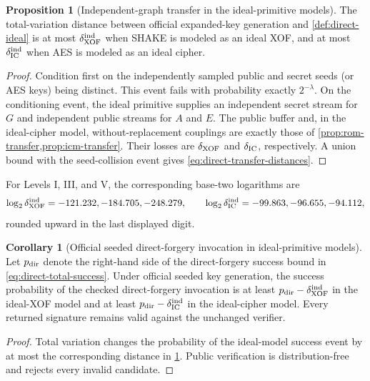 \documentclass[11pt,a4paper]{article}
\theoremstyle{definition}
\newtheorem{proposition}[theorem]{Proposition}
\newtheorem{corollary}[theorem]{Corollary}
\theoremstyle{remark}
\begin{document}
\begin{proposition}[Independent-graph transfer in the ideal-primitive models]\label{prop:direct-seeded-transfer}
The total-variation distance between official expanded-key generation and
\cref{def:direct-ideal} is at most $\delta_{\rm XOF}^{\rm ind}$ when SHAKE is
modeled as an ideal XOF, and at most $\delta_{\rm IC}^{\rm ind}$ when AES is
modeled as an ideal cipher.
\end{proposition}

\begin{proof}
Condition first on the independently sampled public and secret seeds (or AES
keys) being distinct.  This event fails with probability exactly $2^{-\lambda}$.
On the conditioning event, the ideal primitive supplies an independent secret
stream for $G$ and independent public streams for $A$ and $E$.  The public
buffer and, in the ideal-cipher model, without-replacement couplings are
exactly those of \cref{prop:rom-transfer,prop:icm-transfer}.  Their losses are
$\delta_{\rm XOF}$ and $\delta_{\rm IC}$, respectively.  A union bound with the
seed-collision event gives \eqref{eq:direct-transfer-distances}.
\end{proof}

For Levels I, III, and V, the corresponding base-two logarithms are
\[
 \log_2\delta_{\rm XOF}^{\rm ind}
   =-121.232,-184.705,-248.279,
 \qquad
 \log_2\delta_{\rm IC}^{\rm ind}
   =-99.863,-96.655,-94.112,
\]
rounded upward in the last displayed digit.

\begin{corollary}[Official seeded direct-forgery invocation in ideal-primitive models]\label{cor:direct-seeded-ideal}
Let $p_{\rm dir}$ denote the right-hand side of the direct-forgery success bound
in \eqref{eq:direct-total-success}.  Under official seeded key generation, the
success probability of the checked direct-forgery invocation is at least
$p_{\rm dir}-\delta_{\rm XOF}^{\rm ind}$ in the ideal-XOF model and at least
$p_{\rm dir}-\delta_{\rm IC}^{\rm ind}$ in the ideal-cipher model.  Every
returned signature remains valid against the unchanged verifier.
\end{corollary}

\begin{proof}
Total variation changes the probability of the ideal-model success event by at
most the corresponding distance in \cref{prop:direct-seeded-transfer}.  Public
verification is distribution-free and rejects every invalid candidate.
\end{proof}
\end{document}
